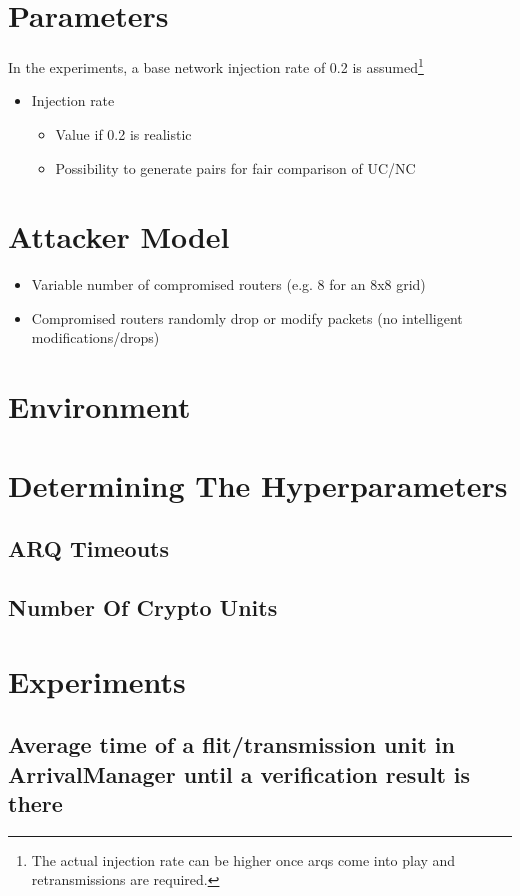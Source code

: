 \section{Parameters}
In the experiments, a base network injection rate of 0.2 is assumed\footnote{The actual injection rate can be higher once \glspl{arq} come into play
and retransmissions are required.}
\begin{itemize}
    \item Injection rate
        \begin{itemize}
            \item Value if 0.2 is realistic
            \item Possibility to generate pairs for fair comparison of UC/NC
        \end{itemize}
\end{itemize}

\section{Attacker Model}
\begin{itemize}
    \item Variable number of compromised routers (e.g. 8 for an 8x8 grid)
    \item Compromised routers randomly drop or modify packets (no intelligent modifications/drops)
\end{itemize}

\section{Environment}

\section{Determining The Hyperparameters}
\subsection{ARQ Timeouts}
\subsection{Number Of Crypto Units}

\section{Experiments}
\subsection{Average time of a flit/transmission unit in ArrivalManager until a verification result is there}
